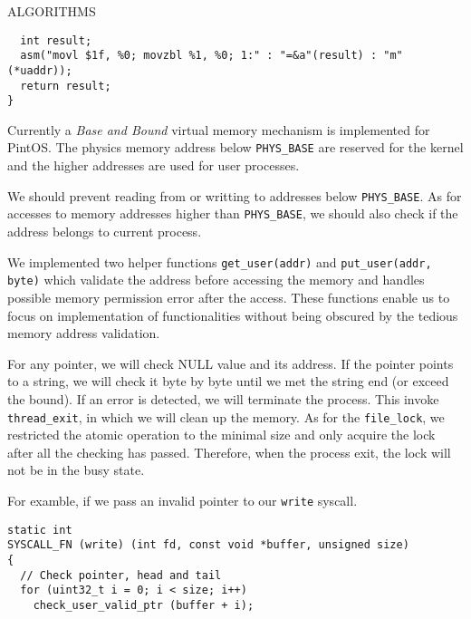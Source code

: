 \begin{aspect}{ALGORITHMS}
\begin{lstlisting}
  int result;
  asm("movl $1f, %0; movzbl %1, %0; 1:" : "=&a"(result) : "m"(*uaddr));
  return result;
}
	\end{lstlisting}
Currently a \emph{Base and Bound} virtual memory mechanism is implemented for PintOS.
The physics memory address below \lstinline{PHYS_BASE} are reserved for the kernel and the higher addresses are used for user processes.

We should prevent reading from or writting to addresses below \lstinline{PHYS_BASE}.
As for accesses to memory addresses higher than \lstinline{PHYS_BASE}, we should also check if the address belongs to current process.

We implemented two helper functions \lstinline{get_user(addr)} and \lstinline{put_user(addr, byte)}
which validate the address before accessing the memory and handles possible memory permission error after the access.
These functions enable us to focus on implementation of functionalities without being obscured by the tedious memory address validation.

For any pointer, we will check NULL value and its address. If the pointer points to a string, we will check it byte by byte until we met the string end (or exceed the bound). If an error is detected, we will terminate the process. This invoke \lstinline{thread_exit}, in which we will clean up the memory. As for the \lstinline{file_lock}, we restricted the atomic operation to the minimal size and only acquire the lock after all the checking has passed. Therefore, when the process exit, the lock will not be in the busy state.

For examble, if we pass an invalid pointer to our \lstinline{write} syscall.
\begin{lstlisting}
static int
SYSCALL_FN (write) (int fd, const void *buffer, unsigned size)
{
  // Check pointer, head and tail
  for (uint32_t i = 0; i < size; i++)
    check_user_valid_ptr (buffer + i);


\end{lstlisting}
\end{aspect}
